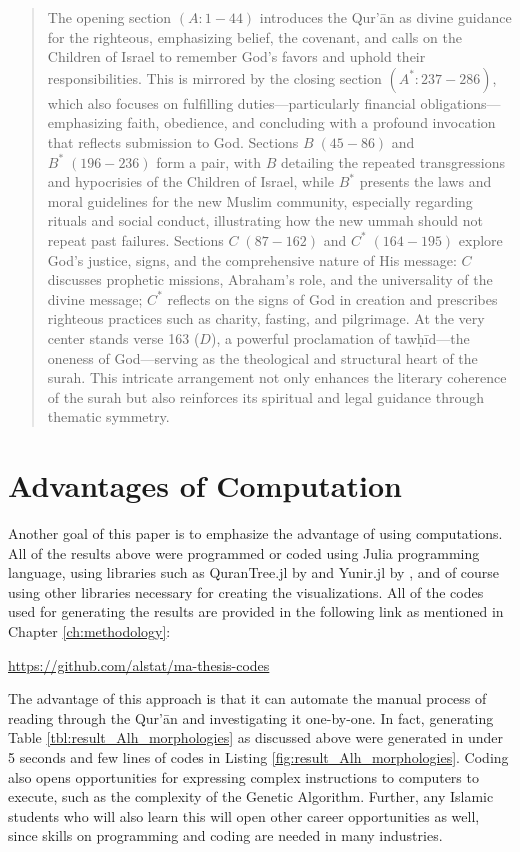 \begin{quotation}
    The opening section $(A: 1-44)$ introduces the Qur'\=an as divine guidance for the righteous, emphasizing belief, the covenant, and calls on the Children of Israel to remember God's favors and uphold their responsibilities. This is mirrored by the closing section $(A^*: 237-286)$, which also focuses on fulfilling duties—particularly financial obligations—emphasizing faith, obedience, and concluding with a profound invocation that reflects submission to God. Sections $B\;(45-86)$ and $B^*\;(196-236)$ form a pair, with $B$ detailing the repeated transgressions and hypocrisies of the Children of Israel, while $B^*$ presents the laws and moral guidelines for the new Muslim community, especially regarding rituals and social conduct, illustrating how the new ummah should not repeat past failures. Sections $C\;(87-162)$ and $C^*\;(164-195)$ explore God's justice, signs, and the comprehensive nature of His message: $C$ discusses prophetic missions, Abraham's role, and the universality of the divine message; $C^*$ reflects on the signs of God in creation and prescribes righteous practices such as charity, fasting, and pilgrimage. At the very center stands verse 163 ($D$), a powerful proclamation of tawḥīd—the oneness of God—serving as the theological and structural heart of the surah. This intricate arrangement not only enhances the literary coherence of the surah but also reinforces its spiritual and legal guidance through thematic symmetry.
\end{quotation}

\section{Advantages of Computation}
Another goal of this paper is to emphasize the advantage of using computations. All of the results above were programmed or coded using Julia programming language, using libraries such as QuranTree.jl by  and Yunir.jl by , and of course using other libraries necessary for creating the visualizations. All of the codes used for generating the results are provided in the following link as mentioned in Chapter \ref{ch:methodology}:
\begin{center}
\url{https://github.com/alstat/ma-thesis-codes}
\end{center}
The advantage of this approach is that it can automate the manual process of reading through the Qur'\=an and investigating it one-by-one. In fact, generating Table \ref{tbl:result_Alh_morphologies} as discussed above were generated in under 5 seconds and few lines of codes in Listing \ref{fig:result_Alh_morphologies}. Coding also opens opportunities for expressing complex instructions to computers to execute, such as the complexity of the Genetic Algorithm. Further, any Islamic students who will also learn this will open other career opportunities as well, since skills on programming and coding are needed in many industries.
